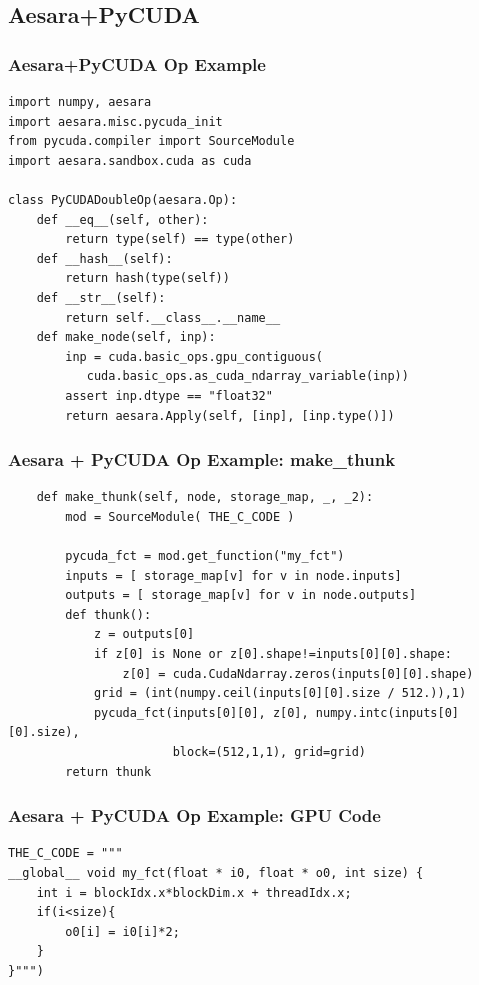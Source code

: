 \documentclass[a4paper,9pt]{beamer}
\begin{document}
\subsection{Aesara+PyCUDA}
\begin{frame}[fragile]
\frametitle{Aesara+PyCUDA Op Example}
\begin{Verbatim}
import numpy, aesara
import aesara.misc.pycuda_init
from pycuda.compiler import SourceModule
import aesara.sandbox.cuda as cuda

class PyCUDADoubleOp(aesara.Op):
    def __eq__(self, other):
        return type(self) == type(other)
    def __hash__(self):
        return hash(type(self))
    def __str__(self):
        return self.__class__.__name__
    def make_node(self, inp):
        inp = cuda.basic_ops.gpu_contiguous(
           cuda.basic_ops.as_cuda_ndarray_variable(inp))
        assert inp.dtype == "float32"
        return aesara.Apply(self, [inp], [inp.type()])
\end{Verbatim}
\end{frame}


\begin{frame}[fragile]
\frametitle{Aesara + PyCUDA Op Example: make\_thunk}
\begin{Verbatim}
    def make_thunk(self, node, storage_map, _, _2):
        mod = SourceModule( THE_C_CODE )

        pycuda_fct = mod.get_function("my_fct")
        inputs = [ storage_map[v] for v in node.inputs]
        outputs = [ storage_map[v] for v in node.outputs]
        def thunk():
            z = outputs[0]
            if z[0] is None or z[0].shape!=inputs[0][0].shape:
                z[0] = cuda.CudaNdarray.zeros(inputs[0][0].shape)
            grid = (int(numpy.ceil(inputs[0][0].size / 512.)),1)
            pycuda_fct(inputs[0][0], z[0], numpy.intc(inputs[0][0].size),
                       block=(512,1,1), grid=grid)
        return thunk
\end{Verbatim}
\end{frame}

\begin{frame}[fragile]
\frametitle{Aesara + PyCUDA Op Example: GPU Code}
\begin{Verbatim}
THE_C_CODE = """
__global__ void my_fct(float * i0, float * o0, int size) {
    int i = blockIdx.x*blockDim.x + threadIdx.x;
    if(i<size){
        o0[i] = i0[i]*2;
    }
}""")
\end{Verbatim}
\end{frame}
\end{document}

